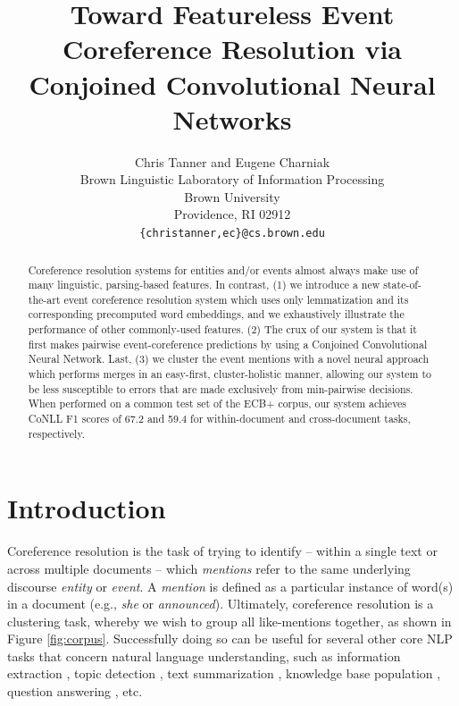 \documentclass[11pt,a4paper]{article}
\title{Toward Featureless Event Coreference Resolution via Conjoined Convolutional Neural Networks}
\author{Chris Tanner \textnormal{and} Eugene Charniak\\
Brown Linguistic Laboratory of Information Processing \\
  Brown University \\
  Providence, RI  02912 \\
  {\tt \{christanner,ec\}@cs.brown.edu} \\}
\date{}
\begin{document}
\maketitle
\begin{abstract}
Coreference resolution systems for entities and/or events almost always make use of many linguistic, parsing-based features.  In contrast, (1) we introduce a new state-of-the-art event coreference resolution system which uses only lemmatization and its corresponding precomputed word embeddings, and we exhaustively illustrate the performance of other commonly-used features.  (2) The crux of our system is that it first makes pairwise event-coreference predictions by using a Conjoined Convolutional Neural Network.  Last, (3) we cluster the event mentions with a novel neural approach which performs merges in an easy-first, cluster-holistic manner, allowing our system to be less susceptible to errors that are made exclusively from min-pairwise decisions.  When performed on a common test set of the ECB+ corpus, our system achieves CoNLL F1 scores of 67.2 and 59.4 for within-document and cross-document tasks, respectively.
\end{abstract}


\section{Introduction}
Coreference resolution is the task of trying to identify -- within a single text or across multiple documents -- which \textit{mentions} refer to the same underlying discourse \textit{entity} or \textit{event}.  A \textit{mention} is defined as a particular instance of word(s) in a document (e.g., \textit{she} or \textit{announced}).  Ultimately, coreference resolution is a clustering task, whereby we wish to group all like-mentions together, as shown in Figure \ref{fig:corpus}.  Successfully doing so can be useful for several other core NLP tasks that concern natural language understanding, such as information extraction \cite{Humphreys:1997}, topic detection \cite{Allan:1998}, text summarization \cite{Daniel:2003}, knowledge base population \cite{Cross_Document_Coreference_Resolution_A_Key_Technology_for_Learning_by_Reading}, question answering \cite{Narayanan:2004:QAB:1220355.1220455}, etc.
\end{document}
